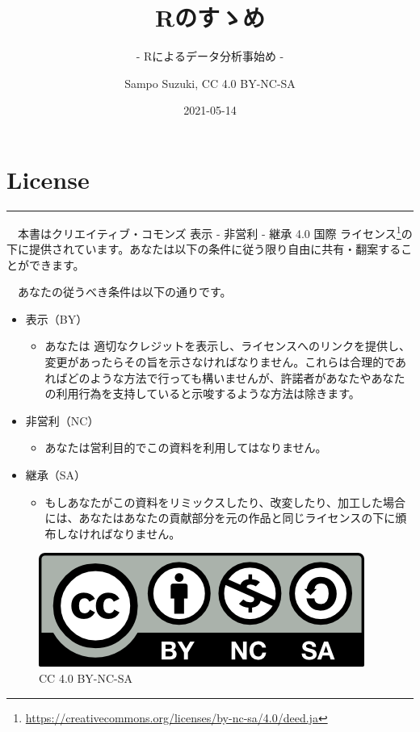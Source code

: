 \documentclass[
  12pt,
]{book}
\title{Rのすゝめ}
\subtitle{- Rによるデータ分析事始め -}
\author{Sampo Suzuki, CC 4.0 BY-NC-SA}
\date{2021-05-14}
\DeclareRobustCommand{\href}[2]{#2\footnote{\url{#1}}}
\providecommand{\tightlist}{%
  \setlength{\itemsep}{0pt}\setlength{\parskip}{0pt}}
\begin{document}
\maketitle

{
\hypersetup{linkcolor=}
\setcounter{tocdepth}{2}
\tableofcontents
}
\hypertarget{license}{%
\chapter*{License}\label{license}}

\begin{center}\rule{0.5\linewidth}{0.5pt}\end{center}

　本書は\href{https://creativecommons.org/licenses/by-nc-sa/4.0/deed.ja}{クリエイティブ・コモンズ 表示 - 非営利 - 継承 4.0 国際 ライセンス}の下に提供されています。あなたは以下の条件に従う限り自由に共有・翻案することができます。

　あなたの従うべき条件は以下の通りです。

\begin{itemize}
\item
  表示（BY）

  \begin{itemize}
  \tightlist
  \item
    あなたは 適切なクレジットを表示し、ライセンスへのリンクを提供し、変更があったらその旨を示さなければなりません。これらは合理的であればどのような方法で行っても構いませんが、許諾者があなたやあなたの利用行為を支持していると示唆するような方法は除きます。
  \end{itemize}
\item
  非営利（NC）

  \begin{itemize}
  \tightlist
  \item
    あなたは営利目的でこの資料を利用してはなりません。
  \end{itemize}
\item
  継承（SA）

  \begin{itemize}
  \tightlist
  \item
    もしあなたがこの資料をリミックスしたり、改変したり、加工した場合には、あなたはあなたの貢献部分を元の作品と同じライセンスの下に頒布しなければなりません。
  \end{itemize}
\end{itemize}

\begin{figure}
\centering
\includegraphics{"./fig/by-nc-sa.png"}
\caption{CC 4.0 BY-NC-SA}
\end{figure}
\end{document}
